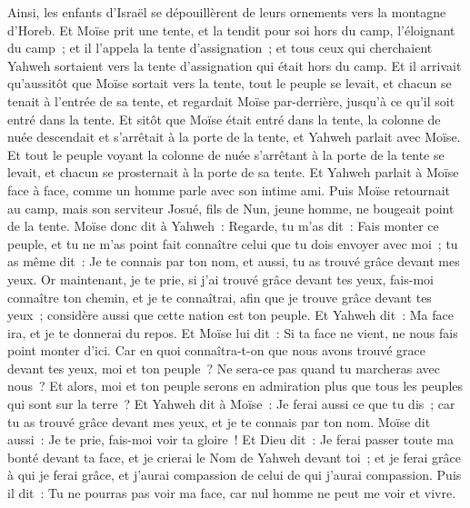 \begin{multicols}{2}
Ainsi, les enfants d'Israël se dépouillèrent de leurs ornements vers la montagne d'Horeb.
Et Moïse prit une tente, et la tendit pour soi hors du camp, l'éloignant du camp~; et il l'appela la tente d'assignation~; et tous ceux qui cherchaient Yahweh sortaient vers la tente d'assignation qui était hors du camp.
Et il arrivait qu'aussitôt que Moïse sortait vers la tente, tout le peuple se levait, et chacun se tenait à l'entrée de sa tente, et regardait Moïse par-derrière, jusqu'à ce qu'il soit entré dans la tente.
Et sitôt que Moïse était entré dans la tente, la colonne de nuée descendait et s'arrêtait à la porte de la tente, et Yahweh parlait avec Moïse.
Et tout le peuple voyant la colonne de nuée s'arrêtant à la porte de la tente se levait, et chacun se prosternait à la porte de sa tente.
Et Yahweh parlait à Moïse face à face, comme un homme parle avec son intime ami. Puis Moïse retournait au camp, mais son serviteur Josué, fils de Nun, jeune homme, ne bougeait point de la tente.
Moïse donc dit à Yahweh~: Regarde, tu m'as dit~: Fais monter ce peuple, et tu ne m'as point fait connaître celui que tu dois envoyer avec moi~; tu as même dit~: Je te connais par ton nom, et aussi, tu as trouvé grâce devant mes yeux.
Or maintenant, je te prie, si j'ai trouvé grâce devant tes yeux, fais-moi connaître ton chemin, et je te connaîtrai, afin que je trouve grâce devant tes yeux~; considère aussi que cette nation est ton peuple.
Et Yahweh dit~: Ma face ira, et je te donnerai du repos.
Et Moïse lui dit~: Si ta face ne vient, ne nous fais point monter d'ici.
Car en quoi connaîtra-t-on que nous avons trouvé grace devant tes yeux, moi et ton peuple~? Ne sera-ce pas quand tu marcheras avec nous~? Et alors, moi et ton peuple serons en admiration plus que tous les peuples qui sont sur la terre~?
Et Yahweh dit à Moïse~: Je ferai aussi ce que tu dis~; car tu as trouvé grâce devant mes yeux, et je te connais par ton nom.
Moïse dit aussi~: Je te prie, fais-moi voir ta gloire~!
Et Dieu dit~: Je ferai passer toute ma bonté devant ta face, et je crierai le Nom de Yahweh devant toi~; et je ferai grâce à qui je ferai grâce, et j'aurai compassion de celui de qui j'aurai compassion.
Puis il dit~: Tu ne pourras pas voir ma face, car nul homme ne peut me voir et vivre.

\end{multicols}
